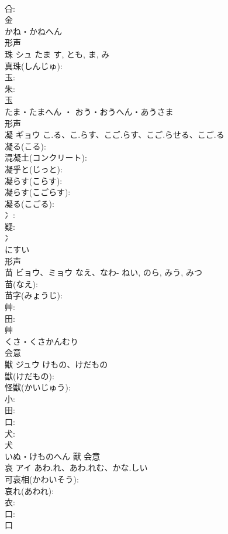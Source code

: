 \documentclass[8pt]{extreport}
\begin{document}
\begin{CJK}{UTF8}{min}
\\	㕣: 
\\	金	
\\	かね・かねへん	
\\	形声 
\\	珠	シュ	たま	す, とも, ま, み	
\\	真珠(しんじゅ): 
\\	玉: 
\\	朱: 
\\	玉	
\\	たま・たまへん ・ おう・おうへん・あうさま	
\\	形声 
\\	凝	ギョウ	こ.る、こ.らす、こご.らす、こご.らせる、こご.る		
\\	凝る(こる): 
\\	混凝土(コンクリート): 
\\	凝乎と(じっと): 
\\	凝らす(こらす): 
\\	凝らす(こごらす): 
\\	凝る(こごる): 
\\	冫: 
\\	疑: 
\\	冫	
\\	にすい	
\\	形声 
\\	苗	ビョウ、ミョウ	なえ、なわ-	ねい, のら, みう, みつ	
\\	苗(なえ): 
\\	苗字(みょうじ): 
\\	艸: 
\\	田: 
\\	艸	
\\	くさ・くさかんむり	
\\	会意 
\\	獣	ジュウ	けもの、けだもの		
\\	獣(けだもの): 
\\	怪獣(かいじゅう): 
\\	小: 
\\	田: 
\\	口: 
\\	犬: 
\\	犬	
\\	いぬ・けものへん	獸	会意 
\\	哀	アイ	あわ.れ、あわ.れむ、かな.しい		
\\	可哀相(かわいそう): 
\\	哀れ(あわれ): 
\\	衣: 
\\	口: 
\\	口	

\end{CJK}
\end{document}
